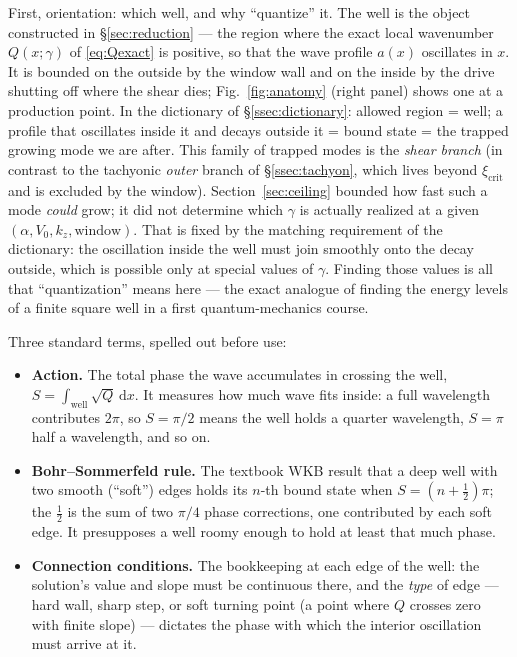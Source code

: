 \documentclass[11pt,a4paper]{article}
\numberwithin{equation}{section}
\theoremstyle{remark}
\newcommand{\Vo}{V_0}
\newcommand{\kz}{k_z}
\newcommand{\dd}{\mathrm{d}}
\begin{document}
First, orientation: which well, and why ``quantize'' it. The well is
the object constructed in \S\ref{sec:reduction} --- the region where
the exact local wavenumber $Q(x;\gamma)$ of \eqref{eq:Qexact} is
positive, so that the wave profile $a(x)$ oscillates in $x$. It is
bounded on the outside by the window wall and on the inside by the
drive shutting off where the shear dies; Fig.~\ref{fig:anatomy} (right
panel) shows one at a production point. In the dictionary of
\S\ref{ssec:dictionary}: allowed region = well; a profile that
oscillates inside it and decays outside it = bound state = the trapped
growing mode we are after. This family of trapped modes is the
\emph{shear branch} (in contrast to the tachyonic \emph{outer} branch
of \S\ref{ssec:tachyon}, which lives beyond $\xi_{\mathrm{crit}}$ and is
excluded by the window). Section~\ref{sec:ceiling} bounded how fast such
a mode \emph{could} grow; it did not determine which $\gamma$ is
actually realized at a given $(\alpha,\Vo,\kz,\text{window})$. That is
fixed by the matching requirement of the dictionary: the oscillation
inside the well must join smoothly onto the decay outside, which is
possible only at special values of $\gamma$. Finding those values is
all that ``quantization'' means here --- the exact analogue of finding
the energy levels of a finite square well in a first quantum-mechanics
course.

Three standard terms, spelled out before use:
\begin{itemize}
\item \textbf{Action.} The total phase the wave accumulates in crossing
the well, $S=\int_{\mathrm{well}}\sqrt{Q}\,\dd x$. It measures how much
wave fits inside: a full wavelength contributes $2\pi$, so $S=\pi/2$
means the well holds a quarter wavelength, $S=\pi$ half a wavelength,
and so on.
\item \textbf{Bohr--Sommerfeld rule.} The textbook WKB result that a
deep well with two smooth (``soft'') edges holds its $n$-th bound state
when $S=(n+\tfrac12)\pi$; the $\tfrac12$ is the sum of two $\pi/4$
phase corrections, one contributed by each soft edge. It presupposes a
well roomy enough to hold at least that much phase.
\item \textbf{Connection conditions.} The bookkeeping at each edge of
the well: the solution's value and slope must be continuous there, and
the \emph{type} of edge --- hard wall, sharp step, or soft turning
point (a point where $Q$ crosses zero with finite slope) --- dictates
the phase with which the interior oscillation must arrive at it.
\end{itemize}
\end{document}
